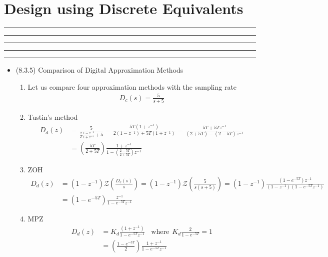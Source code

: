 \setcounter{chapter}{7}
\setcounter{section}{2}
\section{Design using Discrete Equivalents}
\vspace{-8pt} \hrule \hrule \hrule \hrule \hrule  \vspace{12pt}
\begin{itemize}

\item (8.3.5) Comparison of Digital Approximation Methods 
	\begin{enumerate}
		\item Let us compare four approximation methods with the sampling rate 
		\begin{align*}
			D_c(s) = \frac{5}{s+5}
		\end{align*}
		\item Tustin's method
		\begin{align*}
			D_d(z) &= \frac{5}{\frac{2}{T} \frac{1-z^{-1}}{1+z^{-1}} +5} = \frac{5T(1+z^{-1})}{2(1-z^{-1}) +5T(1+z^{-1})} = \frac{5T + 5T z^{-1}}{ (2+5T) - (2-5T)z^{-1}} \\
			&= \left( \frac{5T}{2+5T} \right) \frac{ 1+ z^{-1} } { 1 - \left( \frac{2-5T}{2+5T} \right) z^{-1}} 
		\end{align*}
		\item ZOH 
		\begin{align*}
			D_d(z) &= (1-z^{-1}) \mathcal{Z} \left( \frac{D_c(s)}{s} \right) =  (1-z^{-1}) \mathcal{Z} \left( \frac{5}{s(s+5)} \right) =(1-z^{-1})  \frac{(1-e^{-5T})z^{-1}}{(1-z^{-1})(1-e^{-5T}z^{-1})} \\
			&= (1-e^{-5T}) \frac{z^{-1}}{1-e^{-5T}z^{-1}} 
		\end{align*}
		\item MPZ 
		\begin{align*}
			D_d(z) &= K_d \frac{(1+z^{-1})}{1-e^{-5T}z^{-1}} ~~~~\mbox{where}~~ K_d \frac{2}{1-e^{-5T}} = 1 \\
			&= \left( \frac{1-e^{-5T}}{2} \right)  \frac{1+z^{-1}}{1-e^{-5T}z^{-1}}  
		\end{align*}

	\end{enumerate}
\end{itemize}		